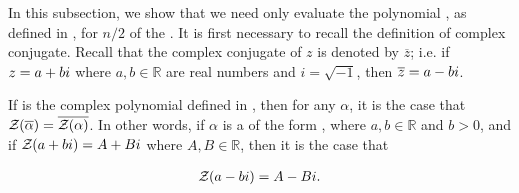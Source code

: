 \documentclass[11pt, oneside]{Thesis} %
\begin{document}
In this subsection, we show that we need only evaluate the polynomial
\fullZx, as defined in
, for $n/2$ of the \nRoUs.
 It is first necessary to recall the definition of complex
conjugate.
Recall that the complex conjugate of $z$ is denoted by $\overline{z}$;
i.e. if $z=a+bi$ where $a,b \in \mathbb{R}$ are real numbers and
$i = \sqrt{-1}$,  then $\overline{z} = a-bi$.

\begin{lemma}
\label{lem:fftbor:compconj}

If \fullZx is the complex polynomial defined in
, then for any \nRoU
 $\alpha$, it is the case that ${\mathcal Z}_{}(\overline{\alpha}) =
\overline{{\mathcal Z}_{}(\alpha)}$. In other words, if $\alpha$ is a \nRoU
 of the form \aPbi, where $a,b \in \mathbb{R}$ and $b>0$, and
if ${\mathcal Z}_{}(a+bi) = A + Bi$ where $A,B \in \mathbb{R}$, then it is the case that

\begin{align}
{\mathcal Z}_{}(a-bi) = A - Bi.
\end{align}

\end{lemma}
\end{document}
